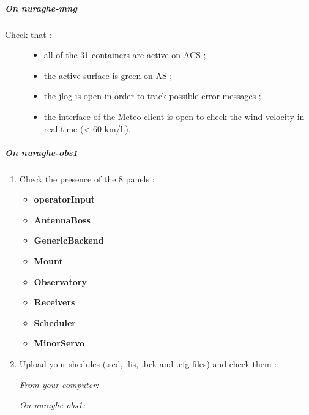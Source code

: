 \documentclass[letterpaper,10pt,english]{sphinxmanual}
\begin{document}
\subparagraph{On nuraghe-mng}
\label{SpectralLine/C-band/Xarcos/before-obs:on-nuraghe-mng}\begin{description}
\item[{Check that :}] \leavevmode\begin{itemize}
\item {} 
all of the 31 containers are active on ACS ;

\item {} 
the active surface is green on AS ;

\item {} 
the jlog is open in order to track possible error messages ;

\item {} 
the interface of the Meteo client is open to check the wind velocity in real time (\textless{} 60 km/h).

\end{itemize}

\end{description}


\subparagraph{On nuraghe-obs1}
\label{SpectralLine/C-band/Xarcos/before-obs:on-nuraghe-obs1}\begin{enumerate}
\item {} 
Check the presence of the 8 panels :
\begin{itemize}
\item {} 
\textbf{operatorInput}

\item {} 
\textbf{AntennaBoss}

\item {} 
\textbf{GenericBackend}

\item {} 
\textbf{Mount}

\item {} 
\textbf{Observatory}

\item {} 
\textbf{Receivers}

\item {} 
\textbf{Scheduler}

\item {} 
\textbf{MinorServo}

\end{itemize}

\end{enumerate}
\begin{enumerate}
\setcounter{enumi}{1}
\item {} 
Upload your shedules (.scd, .lis, .bck and .cfg files) and check them :

\emph{From your computer:}


\emph{On nuraghe-obs1:}



\end{enumerate}
\end{document}
